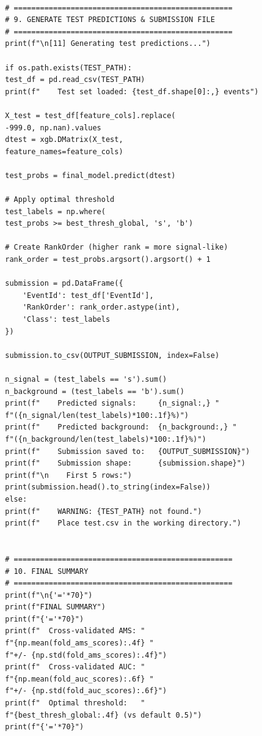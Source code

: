 \documentclass[12pt]{article}
\begin{document}
\begin{lstlisting}[caption={Main.py -- Complete implementation}]
		
		# ==================================================
		# 9. GENERATE TEST PREDICTIONS & SUBMISSION FILE
		# ==================================================
		print(f"\n[11] Generating test predictions...")
		
		if os.path.exists(TEST_PATH):
		test_df = pd.read_csv(TEST_PATH)
		print(f"    Test set loaded: {test_df.shape[0]:,} events")
		
		X_test = test_df[feature_cols].replace(
		-999.0, np.nan).values
		dtest = xgb.DMatrix(X_test,
		feature_names=feature_cols)
		
		test_probs = final_model.predict(dtest)
		
		# Apply optimal threshold
		test_labels = np.where(
		test_probs >= best_thresh_global, 's', 'b')
		
		# Create RankOrder (higher rank = more signal-like)
		rank_order = test_probs.argsort().argsort() + 1
		
		submission = pd.DataFrame({
			'EventId': test_df['EventId'],
			'RankOrder': rank_order.astype(int),
			'Class': test_labels
		})
		
		submission.to_csv(OUTPUT_SUBMISSION, index=False)
		
		n_signal = (test_labels == 's').sum()
		n_background = (test_labels == 'b').sum()
		print(f"    Predicted signals:     {n_signal:,} "
		f"({n_signal/len(test_labels)*100:.1f}%)")
		print(f"    Predicted background:  {n_background:,} "
		f"({n_background/len(test_labels)*100:.1f}%)")
		print(f"    Submission saved to:   {OUTPUT_SUBMISSION}")
		print(f"    Submission shape:      {submission.shape}")
		print(f"\n    First 5 rows:")
		print(submission.head().to_string(index=False))
		else:
		print(f"    WARNING: {TEST_PATH} not found.")
		print(f"    Place test.csv in the working directory.")
		
		
		# ==================================================
		# 10. FINAL SUMMARY
		# ==================================================
		print(f"\n{'='*70}")
		print(f"FINAL SUMMARY")
		print(f"{'='*70}")
		print(f"  Cross-validated AMS: "
		f"{np.mean(fold_ams_scores):.4f} "
		f"+/- {np.std(fold_ams_scores):.4f}")
		print(f"  Cross-validated AUC: "
		f"{np.mean(fold_auc_scores):.6f} "
		f"+/- {np.std(fold_auc_scores):.6f}")
		print(f"  Optimal threshold:   "
		f"{best_thresh_global:.4f} (vs default 0.5)")
		print(f"{'='*70}")
	\end{lstlisting}
	
\end{document}
